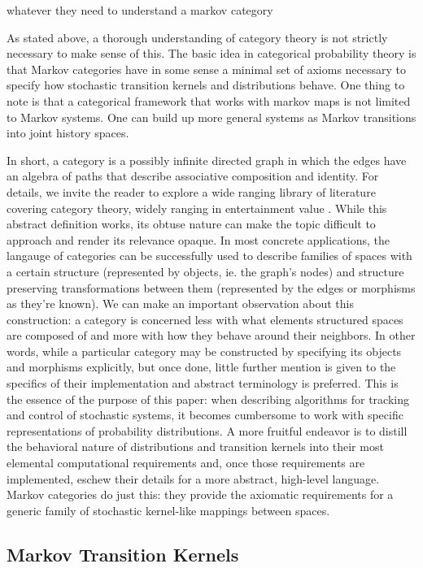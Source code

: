 \documentclass[letterpaper, 10 pt, conference]{ieeeconf}  %
\begin{document}
whatever they need to understand a markov category

As stated above, a thorough understanding of category theory is not strictly necessary to make sense of this.
The basic idea in categorical probability theory is that Markov categories have in some sense a minimal set of axioms necessary to specify how stochastic transition kernels and distributions behave.
One thing to note is that a categorical framework that works with markov maps is not limited to Markov systems.
One can build up more general systems as Markov transitions into joint history spaces.

In short, a category is a possibly infinite directed graph in which the edges have an algebra of paths that describe associative composition and identity.
For details, we invite the reader to explore a wide ranging library of literature covering category theory, widely ranging in entertainment value \cite{bartosz}\cite{context}.
While this abstract definition works, its obtuse nature can make the topic difficult to approach and render its relevance opaque.
In most concrete applications, the langauge of categories can be successfully used to describe families of spaces with a certain structure (represented by objects, ie. the graph's nodes) and structure preserving transformations between them (represented by the edges or morphisms as they're known).
We can make an important observation about this construction: a category is concerned less with what elements structured spaces are composed of and more with how they behave around their neighbors.
In other words, while a particular category may be constructed by specifying its objects and morphisms explicitly, but once done, little further mention is given to the specifics of their implementation and abstract terminology is preferred.
This is the essence of the purpose of this paper: when describing algorithms for tracking and control of stochastic systems, it becomes cumbersome to work with specific representations of probability distributions.
A more fruitful endeavor is to distill the behavioral nature of distributions and transition kernels into their most elemental computational requirements and, once those requirements are implemented, eschew their details for a more abstract, high-level language.
Markov categories do just this: they provide the axiomatic requirements for a generic family of stochastic kernel-like mappings between spaces.

\subsection{Markov Transition Kernels}
\end{document}
